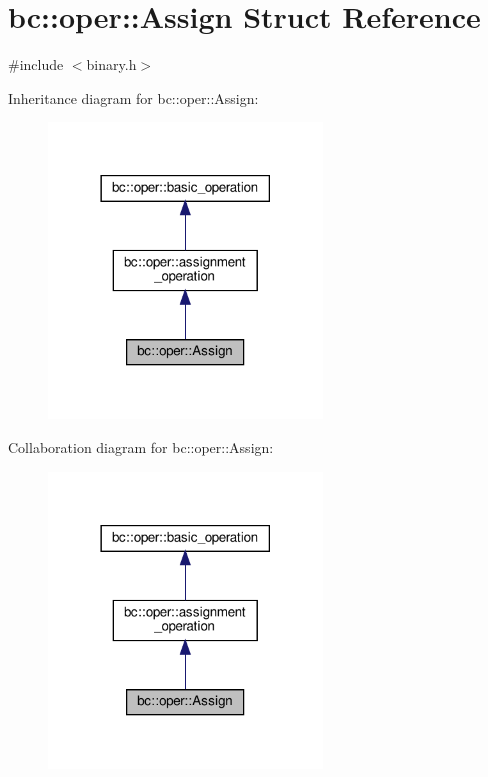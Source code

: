 \hypertarget{structbc_1_1oper_1_1Assign}{}\section{bc\+:\+:oper\+:\+:Assign Struct Reference}
\label{structbc_1_1oper_1_1Assign}


{\ttfamily \#include $<$binary.\+h$>$}



Inheritance diagram for bc\+:\+:oper\+:\+:Assign\+:\nopagebreak
\begin{figure}[H]
\begin{center}
\leavevmode
\includegraphics[width=206pt]{structbc_1_1oper_1_1Assign__inherit__graph}
\end{center}
\end{figure}


Collaboration diagram for bc\+:\+:oper\+:\+:Assign\+:\nopagebreak
\begin{figure}[H]
\begin{center}
\leavevmode
\includegraphics[width=206pt]{structbc_1_1oper_1_1Assign__coll__graph}
\end{center}
\end{figure}
